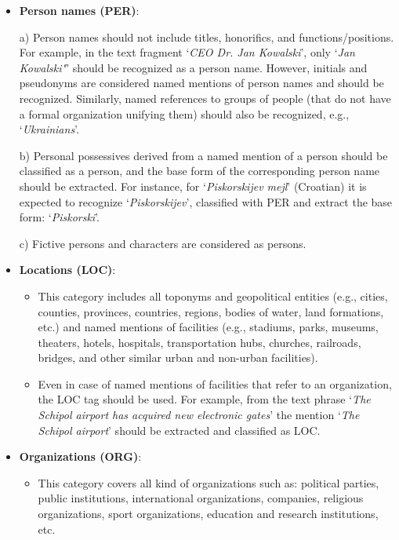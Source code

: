 \documentclass[11pt]{article}
\begin{document}
\begin{itemize}

\item \textbf{Person names (PER)}:

a) Person names should not include titles, honorifics, and functions/positions. For example, in the text fragment `\textit{CEO Dr. Jan Kowalski}', only `\textit{Jan Kowalski"}' should be recognized as a person name. However, initials and pseudonyms are considered named mentions of person names and should be recognized. Similarly, named references to groups of people (that do not have a formal organization unifying them) should also be recognized, e.g., `\textit{Ukrainians}'.

b) Personal possessives derived from a named mention of a person should be classified as a person, and the base form of the corresponding person name should be extracted. For instance, for `\textit{Piskorskijev mejl}' (Croatian) it is expected to recognize `\textit{Piskorskijev}', classified with PER and extract the base form: `\textit{Piskorski}'.

c) Fictive persons and characters are considered as persons.

\item \textbf{Locations (LOC)}:

\begin{itemize}

\item This category includes all toponyms and geopolitical entities (e.g., cities, counties, provinces, countries, regions, bodies of water, land formations, etc.) and named mentions of facilities (e.g., stadiums, parks, museums, theaters, hotels, hospitals, transportation hubs, churches, railroads, bridges, and other similar urban and non-urban facilities).

\item Even in case of named mentions of facilities that refer to an organization, the LOC tag should be used. For example, from the text phrase `\textit{The Schipol airport has acquired new electronic gates}' the mention `\textit{The Schipol airport}' should be extracted and classified as LOC.

\end{itemize}

\item \textbf{Organizations (ORG)}:

\begin{itemize}

\item This category covers all kind of organizations such as: political parties, public institutions, international organizations, companies, religious organizations, sport organizations, education and research institutions, etc.


\end{itemize}
\end{itemize}
\end{document}
